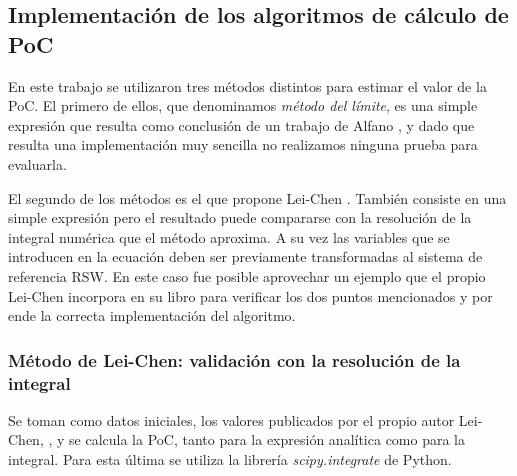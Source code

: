 \begin{table}[H]
\caption{Casos de prueba tomados del trabajo de  Xu \& Xiong \citep{xu2014method}.}
\label{tab:escenariosxx}
\end{table}

\subsection*{Implementaci\'on de los algoritmos de c\'alculo de PoC}
En este trabajo se utilizaron tres m\'etodos distintos para estimar el valor de la PoC. El primero de ellos, que denominamos {\it{m\'etodo del l\'imite}}, es una simple expresi\'on que resulta como conclusi\'on de un trabajo de Alfano \citep{alfano2008method}, y dado que resulta una implementaci\'on muy sencilla no realizamos ninguna prueba para evaluarla.

El segundo de los m\'etodos es el que propone Lei-Chen \citep{leichen}. Tambi\'en consiste en una simple expresi\'on pero el resultado puede compararse con la resoluci\'on de la integral num\'erica que el m\'etodo aproxima. A su vez las variables que se introducen en la ecuaci\'on deben ser previamente transformadas al sistema de referencia RSW. En este caso fue posible aprovechar un ejemplo que el propio Lei-Chen incorpora en su libro para verificar los dos puntos mencionados y por ende la correcta implementaci\'on del algoritmo.

\subsubsection*{M\'etodo de Lei-Chen: validaci\'on con la resoluci\'on de la integral}
Se toman como datos iniciales, los valores publicados por el propio autor Lei-Chen, \citep{leichen}, y se calcula la PoC, tanto para la expresi\'on anal\'itica como para la integral. Para esta \'ultima se utiliza la librer\'ia {\it{scipy.integrate}}  de Python.\\

